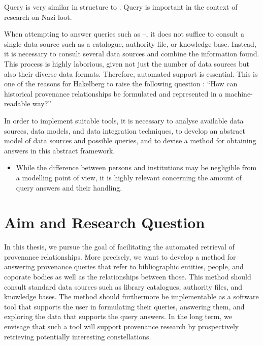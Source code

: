 Query  is very similar in structure to .
Query  is important in the context of research on Nazi loot.



When attempting to answer queries such as --,
it does not suffice to consult a single data source such as
a catalogue, authority file, or knowledge base.
Instead, it is necessary to consult several data sources
and combine the information found. This process is highly laborious,
given not just the number of data sources but also their diverse
data formats. Therefore, automated support is essential.
This is one of the reasons for Hakelberg
to raise the following question \autocite[p.\,46, translated from German]{Hakelberg2016}:
\enquote{How can historical provenance relationships be formulated and represented
in a machine-readable way?}

In order to implement suitable tools,
it is necessary to analyse available data sources, data models, and data integration techniques,
to develop an abstract model of data sources and possible queries,
and to devise a method for obtaining answers in this abstract framework.

%
\begin{itemize}
  \item
    While the difference between persons and institutions may be negligible
    from a modelling point of view, it is highly relevant concerning the
    amount of query answers and their handling.
\end{itemize}

\section{Aim and Research Question}
\label{sec:research_questions}

In this thesis, we pursue the goal of facilitating
the automated retrieval of provenance relationships.
More precisely,
we want to develop a method for answering provenance queries that refer to bibliographic entities, people, and coporate bodies
as well as the relationships between those. This method should consult standard data sources such as
library catalogues, authority files, and knowledge bases. The method should furthermore be implementable as a software tool
that supports the user in formulating their queries, answering them, and exploring the data that supports the query answers.
In the long term, we envisage that such a tool will support provenance research
by prospectively retrieving potentially interesting constellations.

